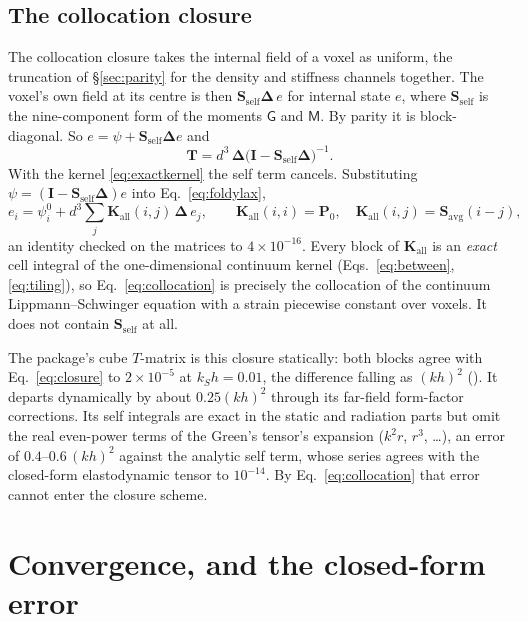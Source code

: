 \documentclass[extra,mreferee]{gji}
\newcommand{\bI}{\mathbf{I}}
\newcommand{\bS}{\mathbf{S}}
\newcommand{\bT}{\mathbf{T}}
\newcommand{\bK}{\mathbf{K}}
\newcommand{\bP}{\mathbf{P}}
\newcommand{\bD}{\boldsymbol{\Delta}}
\begin{document}
\subsection{The collocation closure}\label{sec:closure}

The collocation closure takes the internal field of a voxel as uniform, the truncation of
\S\ref{sec:parity} for the density and stiffness channels together. The voxel's own field at its
centre is then $\bS_{\text{self}}\bD\,e$ for internal state $e$, where $\bS_{\text{self}}$ is the
nine-component form of the moments $\mathsf G$ and $\mathsf M$. By parity it is block-diagonal. So
$e=\psi+\bS_{\text{self}}\bD e$ and
\begin{equation}\label{eq:closure}
  \bT=d^3\,\bD\bigl(\bI-\bS_{\text{self}}\bD\bigr)^{-1}.
\end{equation}
With the kernel \eqref{eq:exactkernel} the self term cancels. Substituting
$\psi=(\bI-\bS_{\text{self}}\bD)e$ into Eq.~\eqref{eq:foldylax},
\begin{equation}\label{eq:collocation}
  e_i=\psi^0_i+d^3\sum_j \bK_{\text{all}}(i,j)\,\bD\,e_j,
  \qquad
  \bK_{\text{all}}(i,i)=\bP_0,\quad \bK_{\text{all}}(i,j)=\bS_{\text{avg}}(i-j),
\end{equation}
an identity checked on the matrices to $4\times10^{-16}$. Every block of $\bK_{\text{all}}$ is an
\emph{exact} cell integral of the one-dimensional continuum kernel (Eqs.~\eqref{eq:between},
\eqref{eq:tiling}), so Eq.~\eqref{eq:collocation} is precisely the collocation of the continuum
Lippmann--Schwinger equation with a strain piecewise constant over voxels. It does not contain
$\bS_{\text{self}}$ at all.

The package's cube $T$-matrix is this closure statically: both blocks agree with
Eq.~\eqref{eq:closure} to $2\times10^{-5}$ at $k_Sh=0.01$, the difference falling
as $(kh)^2$ (). It departs dynamically by about $0.25(kh)^2$ through its
far-field form-factor corrections. Its self integrals are exact in the static and radiation parts
but omit the real even-power terms of the Green's tensor's expansion ($k^2r$, $r^3$, \dots), an
error of $0.4$--$0.6\,(kh)^2$ against the analytic self term, whose series agrees with the
closed-form elastodynamic tensor to $10^{-14}$. By Eq.~\eqref{eq:collocation} that error cannot enter
the closure scheme.

\section{Convergence, and the closed-form error}\label{sec:convergence}
\end{document}
